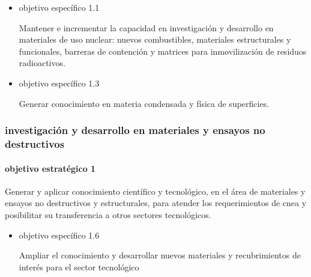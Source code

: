 \begin{itemize}

\item objetivo específico 1.1

  Mantener e incrementar la capacidad en investigación y desarrollo en
  materiales de uso nuclear: nuevos combustibles, materiales estructurales y
  funcionales, barreras de contención y matrices para inmovilización de
  residuos radioactivos.

\item objetivo específico 1.3

  Generar conocimiento en materia condensada y física de superficies.

\end{itemize}

\subsubsection{investigación y desarrollo en materiales y ensayos no destructivos}

\paragraph{objetivo estratégico 1}

Generar y aplicar conocimiento científico y tecnológico, en el área de
materiales y ensayos no destructivos y estructurales, para atender los
requerimientos de cnea y posibilitar su transferencia a otros sectores
tecnológicos.

\begin{itemize}

\item  objetivo específico 1.6

  Ampliar el conocimiento y desarrollar
nuevos materiales y recubrimientos de interés para el sector tecnológico

\end{itemize}
